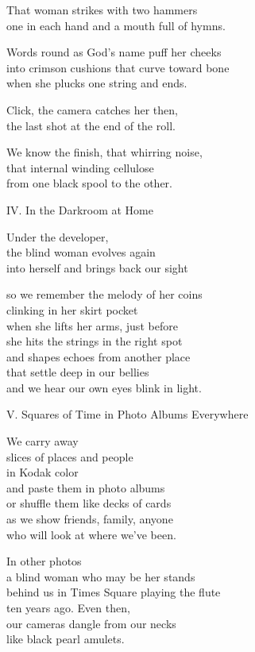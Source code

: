 \documentclass[twoside,10pt]{book}
\begin{document}
That woman strikes with two hammers\\
one in each hand and a mouth full of hymns.

Words round as God's name puff her cheeks\\
into crimson cushions that curve toward bone\\
when she plucks one string and ends.

Click, the camera catches her then,\\
the last shot at the end of the roll.

We know the finish, that whirring noise,\\
that internal winding cellulose\\
from one black spool to the other.

IV.  In the Darkroom at Home

Under the developer,\\
the blind woman evolves again\\
into herself and brings back our sight

so we remember the melody of her coins\\
clinking in her skirt pocket\\
when she lifts her arms, just before\\
she hits the strings in the right spot\\
and shapes echoes from another place\\
that settle deep in our bellies\\
and we hear our own eyes blink in light.


V.  Squares of Time in Photo Albums Everywhere

We carry away\\
slices of places and people\\
in Kodak color\\
and paste them in photo albums\\
or shuffle them like decks of cards\\
as we show friends, family, anyone\\
who will look at where we've been.

In other photos\\
a blind woman who may be her stands\\
behind us in Times Square playing the flute\\
ten years ago. Even then,\\
our cameras dangle from our necks\\
like black pearl amulets.
\end{document}
